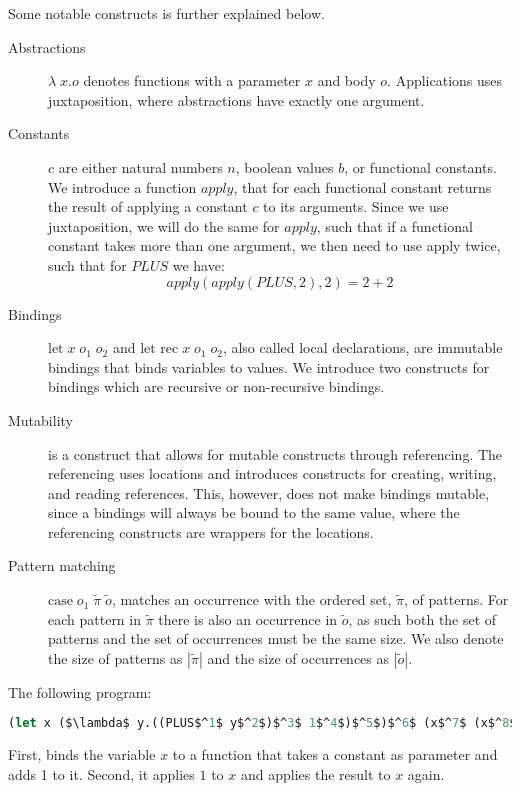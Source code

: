 \documentclass[../../master.tex]{subfiles}
\begin{document}
Some notable constructs is further explained below.
\begin{description}
	\item[Abstractions] $\lambda\;x.o$ denotes functions with a parameter $x$ and body $o$.
		Applications uses juxtaposition, where abstractions have exactly one argument.

	\item[Constants] $c$ are either natural numbers $n$, boolean values $b$, or functional constants.
		We introduce a function $apply$, that for each functional constant returns the result of applying a constant $c$ to its arguments.
		Since we use juxtaposition, we will do the same for $apply$, such that if a functional constant takes more than one argument, we then need to use apply twice, such that for $PLUS$ we have:
		$$apply(apply(PLUS,2),2)=2+2$$

	\item[Bindings] $\mbox{let} \; x \; o_1 \; o_2$ and $\mbox{let rec} \; x \; o_1 \; o_2$, also called local declarations, are immutable bindings that binds variables to values.
		We introduce two constructs for bindings which are recursive or non-recursive bindings.

	\item[Mutability] is a construct that allows for mutable constructs through referencing.
		The referencing uses locations and introduces constructs for creating, writing, and reading references.
		This, however, does not make bindings mutable, since a bindings will always be bound to the same value, where the referencing constructs are wrappers for the locations.

	\item[Pattern matching] $\mbox{case} \; o_1 \; \tilde{\pi} \; \tilde{o}$, matches an occurrence with the ordered set, $\tilde{\pi}$, of patterns.
		For each pattern in $\tilde{\pi}$ there is also an occurrence in $\tilde{o}$, as such both the set of patterns and the set of occurrences must be the same size.
		We also denote the size of patterns as $|\tilde{\pi}|$ and the size of occurrences as $|\tilde{o}|$.
\end{description}

\begin{example}[]
The following program:
\begin{lstlisting}[language=Caml, mathescape=true]
(let x ($\lambda$ y.((PLUS$^1$ y$^2$)$^3$ 1$^4$)$^5$)$^6$ (x$^7$ (x$^8$ 1$^9$)$^{10}$)$^{11}$)$^{12}$
\end{lstlisting}
First, binds the variable $x$ to a function that takes a constant as parameter and adds 1 to it.
Second, it applies $1$ to $x$ and applies the result to $x$ again.
\end{example}
\end{document}
